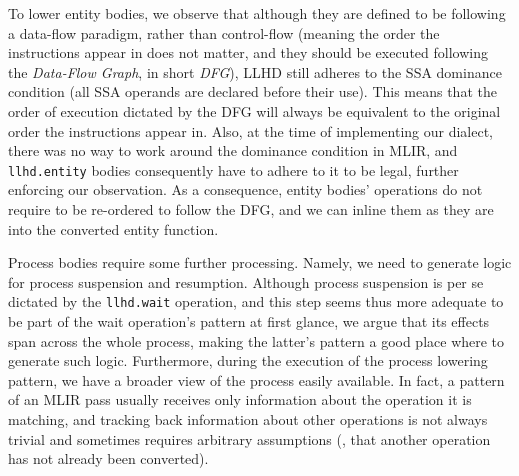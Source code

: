 To lower entity bodies, we observe that although they are defined to be following a data-flow paradigm, rather than control-flow (meaning the order the instructions appear in does not matter, and they should be executed following the \textit{Data-Flow Graph}, in short \textit{DFG}), LLHD still adheres to the SSA dominance condition (all SSA operands are declared before their use). This means that the order of execution dictated by the DFG will always be equivalent to the original order the instructions appear in. Also, at the time of implementing our dialect, there was no way to work around the dominance condition in MLIR, and \texttt{llhd.entity} bodies consequently have to adhere to it to be legal, further enforcing our observation. As a consequence, entity bodies' operations do not require to be re-ordered to follow the DFG, and we can inline them as they are into the converted entity function.

Process bodies require some further processing. Namely, we need to generate logic for process suspension and resumption. Although process suspension is per se dictated by the \texttt{llhd.wait} operation, and this step seems thus more adequate to be part of the wait operation's pattern at first glance, we argue that its effects span across the whole process, making the latter's pattern a good place where to generate such logic. Furthermore, during the execution of the process lowering pattern, we have a broader view of the process easily available. In fact, a pattern of an MLIR pass usually receives only information about the operation it is matching, and tracking back information about other operations is not always trivial and sometimes requires arbitrary assumptions (\eg, that another operation has not already been converted).

